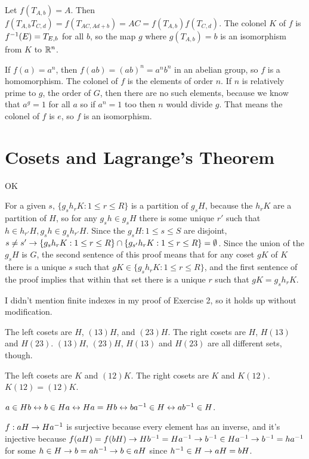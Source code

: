 \documentclass[11pt, oneside]{article}   	%
\begin{document}
\item Let $f(T_{A, b}) = A$. Then $f(T_{A, b}T_{C, d}) = f(T_{AC, Ad + b}) = AC = f(T_{A, b})f(T_{C, d})$. The colonel $K$ of $f$ is $f^{-1}(E) = T_{E, b}$ for all $b$, so the map $g$ where $g(T_{A, b}) = b$ is an isomorphism from $K$ to $\mathbb{R}^n$.
\ee
\item If $f(a) = a^n$, then $f(ab) = (ab)^n = a^nb^n$ in an abelian group, so $f$ is a homomorphism. The colonel of $f$ is the elements of order $n$. If $n$ is relatively prime to $g$, the order of $G$, then there are no such elements, because we know that $a^g = 1$ for all $a$ so if $a^n = 1$ too then $n$ would divide $g$. That means the colonel of $f$ is $e$, so $f$ is an isomorphism. 
\ee
\section{Cosets and Lagrange's Theorem}
\be
\item OK
\item For a given $s$, $\{g_sh_rK:1 \le r \le R\}$ is a partition of $g_sH$, because the $h_rK$ are a partition of $H$, so for any $g_sh \in g_sH$ there is some unique $r'$ such that $h \in h_{r'}H, g_sh \in g_sh_{r'}H$. Since the $g_sH:1 \le s \le S$ are disjoint, $s \not = s' \rightarrow \{g_sh_rK:1 \le r \le R\} \cap \{g_{s'}h_rK:1 \le r \le R\} = \emptyset$. Since the union of the $g_sH$ is $G$, the second sentence of this proof means that for any coset $gK$ of $K$ there is a unique $s$ such that $gK \in \{g_sh_rK:1 \le r \le R\}$, and the first sentence of the proof implies that within that set there is a unique $r$ such that $gK = g_sh_rK$. 
\item I didn't mention finite indexes in my proof of Exercise 2, so it holds up without modification.
\item \be 
\item The left cosets are $H$, $(13)H$, and $(2 3)H$. The right cosets are $H$, $H(13)$ and $H(23)$. $(13)H$, $(2 3)H$, $H(13)$ and $H(23)$ are all different sets, though. 
\item The left cosets are $K$ and $(12)K$. The right cosets are $K$ and $K(12)$. $K(12) = (12)K$.
\ee
\item $a \in Hb \leftrightarrow b \in Ha \leftrightarrow Ha = Hb \leftrightarrow ba^{-1} \in H \leftrightarrow ab^{-1} \in H$.
\item $f: aH \rightarrow Ha^{-1}$ is surjective because every element has an inverse, and it's injective because $f(aH) = f(bH) \rightarrow Hb^{-1} = Ha^{-1} \rightarrow b^{-1} \in Ha^{-1} \rightarrow b^{-1} = ha^{-1}$ for some $h \in H \rightarrow b = ah^{-1} \rightarrow b \in aH$ since $h^{-1} \in H \rightarrow aH = bH$.
\end{document}
